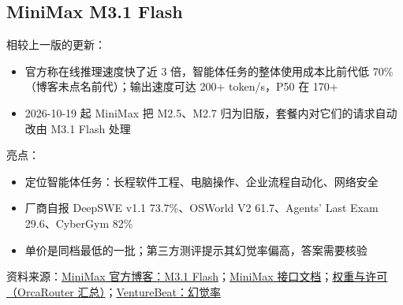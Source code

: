 \documentclass[11pt,a4paper,fontset=none]{ctexart}
\begin{document}
\subsection*{MiniMax M3.1 Flash}
\begin{center}\small
{}
\end{center}
相较上一版的更新：
\begin{itemize}
\item 官方称在线推理速度快了近 3 倍，智能体任务的整体使用成本比前代低 70\%（博客未点名前代）；输出速度可达 200+ token/s，P50 在 170+
\item 2026-10-19 起 MiniMax 把 M2.5、M2.7 归为旧版，套餐内对它们的请求自动改由 M3.1 Flash 处理
\end{itemize}
亮点：
\begin{itemize}
\item 定位智能体任务：长程软件工程、电脑操作、企业流程自动化、网络安全
\item 厂商自报 DeepSWE v1.1 73.7\%、OSWorld V2 61.7、Agents' Last Exam 29.6、CyberGym 82\%
\item 单价是同档最低的一批；第三方测评提示其幻觉率偏高，答案需要核验
\end{itemize}
{\small 资料来源：\href{https://www.minimax.io/blog/minimax-m31f}{MiniMax 官方博客：M3.1 Flash}；\href{https://platform.minimax.io/docs/guides/text-generation}{MiniMax 接口文档}；\href{https://www.orcarouter.ai/blog/minimax-m3-1-flash-open-weights}{权重与许可（OrcaRouter 汇总）}；\href{https://venturebeat.com/technology/minimaxs-new-m3-1-flash-beats-deepseek-and-opus-5-on-a-key-business-benchmark-at-lower-cost-but-with-a-high-hallucination-rate}{VentureBeat：幻觉率}}
\end{document}
